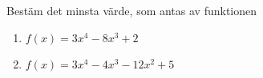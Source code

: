 



Bestäm det minsta värde, som antas av funktionen 
\begin{enumerate}
\item $ f(x) = 3x^4-8x^3+2 $
\item $ f(x) = 3x^4-4x^3-12x^2+5 $
\end{enumerate}